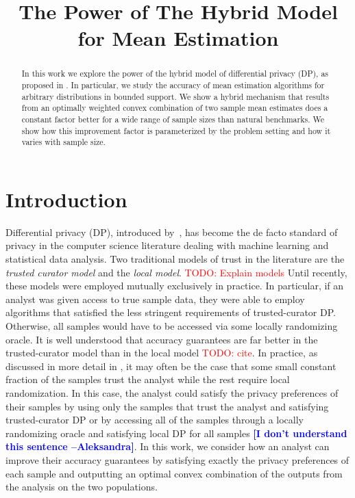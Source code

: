 \documentclass{article}
\title{The Power of The Hybrid Model for Mean Estimation}
\newcommand{\ak}[1]{\textcolor{blue}{\bf\small [#1 --Aleksandra]}}
\newcommand\TODO[1]{\textcolor{red}{TODO: {#1}}}
\theoremstyle{plain}
\begin{document}
\maketitle

\begin{abstract}
In this work we explore the power of the hybrid model of differential privacy (DP), as proposed in \cite{blender}. In particular, we study the accuracy of mean estimation algorithms for arbitrary distributions in bounded support. We show a hybrid mechanism that results from an optimally weighted convex combination of two sample mean estimates does a constant factor better for a wide range of sample sizes than natural benchmarks. We show how this improvement factor is parameterized by the problem setting and how it varies with sample size. 
\end{abstract}

\section{Introduction}

Differential privacy (DP), introduced by~\cite{dmns06}, has become the de facto standard of privacy in the computer science literature dealing with machine learning and statistical data analysis. Two traditional models of trust in the literature are the \textit{trusted curator model} and the \textit{local model}. \TODO{Explain models} Until recently, these models were employed mutually exclusively in practice. In particular, if an analyst was given access to true sample data, they were able to employ algorithms that satisfied the less stringent requirements of trusted-curator DP. Otherwise, all samples would have to be accessed via some locally randomizing oracle. It is well understood that accuracy guarantees are far better in the trusted-curator model than in the local model \TODO{cite}. In practice, as discussed in more detail in \cite{blender}, it may often be the case that some small constant fraction of the samples trust the analyst while the rest require local randomization. In this case, the analyst could satisfy the privacy preferences of their samples by using only the samples that trust the analyst and satisfying trusted-curator DP or by accessing all of the samples through a locally randomizing oracle and satisfying local DP for all samples \ak{I don't understand this sentence}. In this work, we consider how an analyst can improve their accuracy guarantees by satisfying exactly the privacy preferences of each sample and outputting an optimal convex combination of the outputs from the analysis on the two populations. 
\end{document}
